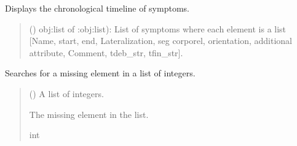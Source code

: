 \documentclass[letterpaper,10pt,english]{sphinxmanual}
\begin{document}
\begin{fulllineitems}
\label{\detokenize{frise:frise.fonctions_frise.afficher_frise}}
\pysigstartsignatures
{}
\pysigstopsignatures
\sphinxAtStartPar
Displays the chronological timeline of symptoms.
\begin{quote}\begin{description}
\sphinxAtStartPar
\sphinxstyleliteralstrong{\sphinxupquote{(}} () \textendash{} obj:list of :obj:list): List of symptoms where each element is a list {[}Name, start, end, Lateralization, seg corporel, orientation, additional attribute, Comment, tdeb\_str, tfin\_str{]}.

\end{description}\end{quote}

\end{fulllineitems}


\begin{fulllineitems}
\label{\detokenize{frise:frise.fonctions_frise.chercherElt}}
\pysigstartsignatures
{}
\pysigstopsignatures
\sphinxAtStartPar
Searches for a missing element in a list of integers.
\begin{quote}\begin{description}
\sphinxAtStartPar
{} () \textendash{} A list of integers.

\sphinxAtStartPar
The missing element in the list.

\sphinxAtStartPar
int

\end{description}\end{quote}

\end{fulllineitems}

\end{document}
